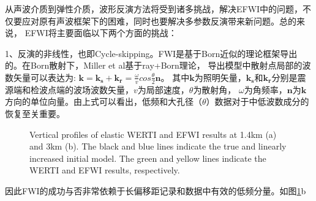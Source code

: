 从声波介质到弹性介质，波形反演方法将受到诸多挑战，解决EFWI中的问题，不仅要应对原有声波框架下的困难，同时也要解决多参数反演带来新问题。总的来说，
EFWI将主要面临以下两个方面的挑战：

1、反演的非线性，也即Cycle-skipping。FWI是基于Born近似的理论框架导出的。在Born散射下，Miller et al\cite{miller:1987}基于ray+Born理论，
导出模型中散射点局部的波数矢量可以表达为:
$    \mathbf{k}=\mathbf{k_s}+\mathbf{k_r}=\frac{\omega}{v}cos\frac{\theta}{2}\mathbf{n}$。
其中$\mathbf{k}$为照明矢量，$\mathbf{k_s}$和$\mathbf{k_r}$分别是震源端和检波点端的波场波数矢量，$v$为局部速度，$\theta$为散射角，
$\omega$为角频率，$\mathbf{n}$为$\mathbf{k}$方向的单位向量。由上式可以看出，低频和大孔径（$\theta$）数据对于中低波数成分的恢复至关重要。
\begin{figure}[!htb] 
   \centering 
   \caption{Vertical profiles of elastic WERTI and EFWI results at 1.4km (a) and
       3km (b). The black and blue lines indicate the true and linearly         increased
       initial model. The green and yellow lines indicate the WERTI and EFWI    results,
       respectively.
   }
   \label{fig:WavenumberVector}
\end{figure}
因此FWI的成功与否非常依赖于长偏移距记录和数据中有效的低频分量。如图\ref{fig:WavenumberVector}b

